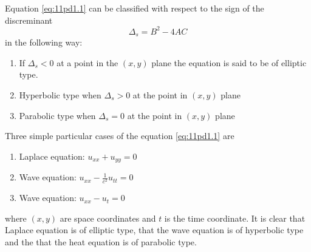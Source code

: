 \documentclass[../main-sheet.tex]{subfiles}
\begin{document}
Equation \eqref{eq:11pd1.1} can be classified with respect to the sign of the discreminant
\begin{equation}
    \Delta_s=B^2-4AC \label{eq:11pd1.2} 
\end{equation}
in the following way:
\begin{enumerate}[label=(\roman*)]
    \item If \(\Delta_s<0\) at a point in the \((x,y)\) plane the equation is said to be of elliptic type.
    \item Hyperbolic type when \(\Delta_s>0\) at the point in \((x,y)\) plane 
    \item Parabolic type when \(\Delta_s=0\) at the point in \((x,y)\) plane 
\end{enumerate}
Three simple particular cases of the equation \eqref{eq:11pd1.1} are
\begin{enumerate}[label=(\roman*)]
    \item Laplace equation: \(u_{xx}+u_{yy}=0\)
    \item Wave equation: \(u_{xx}-\frac{1}{c^2}u_{tt}=0\)
    \item Wave equation: \(u_{xx}-u_{t}=0\)
\end{enumerate}
where \((x,y)\) are space coordinates and \(t\) is the time coordinate. It is clear that Laplace equation is of elliptic type, that the wave equation is of hyperbolic type and the that the heat equation is of parabolic type.
\end{document}

